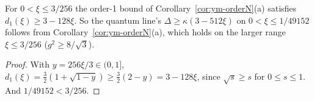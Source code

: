 \begin{proposition}\label{prop:firstgap}
For $0<\xi\le3/256$ the order-1 bound of Corollary~\ref{cor:ym-orderN}(a) satisfies $d_1(\xi)\ge3-128\xi$. So the quantum line's $\Delta\ge\kappa(3-512\xi)$ on $0<\xi\le1/49152$ follows from Corollary~\ref{cor:ym-orderN}(a), which holds on the larger range $\xi\le3/256$ ($g^2\ge8/\sqrt3$).
\end{proposition}
\begin{proof}
With $y=256\xi/3\in(0,1]$, $d_1(\xi)=\frac32(1+\sqrt{1-y})\ge\frac32(2-y)=3-128\xi$, since $\sqrt s\ge s$ for $0\le s\le1$. And $1/49152<3/256$.
\end{proof}
